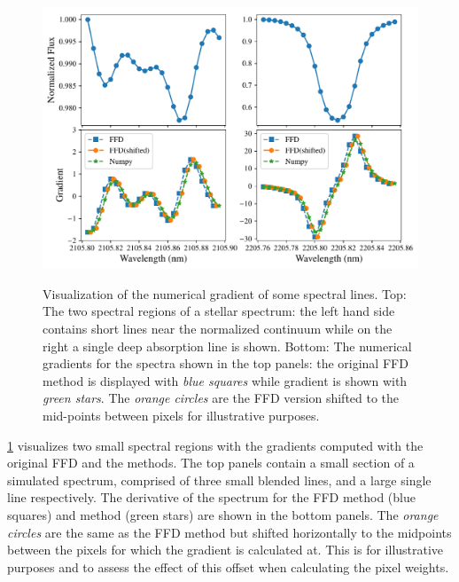 \begin{figure}
    \centering
    \includegraphics[width=0.85\linewidth]{figures/information-content/spectral_gradients}\\
    \caption[Comparing of numerical gradient alogithms.]{Visualization of the numerical gradient of some spectral lines.
        Top: The two spectral regions of a stellar spectrum: the left hand side contains short lines near the normalized continuum while on the right a single deep absorption line is shown.
        Bottom: The numerical gradients for the spectra shown in the top panels: the original {FFD} method is displayed with \emph{blue squares} while \numpy{} gradient is shown with \emph{green stars}.
        The \emph{orange circles} are the {FFD} version shifted to the mid-points between pixels for illustrative purposes.}
    \label{fig:gradients}
\end{figure}




\cref{fig:gradients} visualizes two small spectral regions with the gradients computed with the original {FFD} and the \npgradient{} methods.
The top panels contain a small section of a simulated spectrum, comprised of three small blended lines, and a large single line respectively.
The derivative of the spectrum for the {FFD} method (blue squares) and \npgradient{} method (green stars) are shown in the bottom panels.
The \emph{orange circles} are the same as the {FFD} method but shifted horizontally to the midpoints between the pixels for which the gradient is calculated at.
This is for illustrative purposes and to assess the effect of this offset when calculating the pixel weights.

